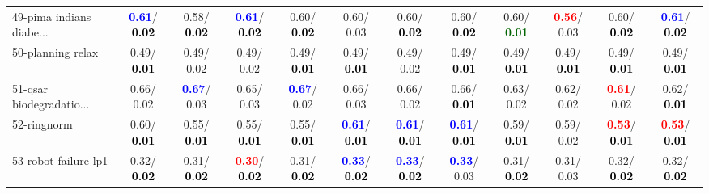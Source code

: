 \begin{table}[h]
\begin{center}
{\begin{tabular}{lc|c|c|c|c|c|c|c|c|c|c}
49-pima indians diabe... & \textcolor{blue}{\textbf{  0.61}}/\textcolor{black}{\textbf{  0.02}} &   0.58/\textcolor{black}{\textbf{  0.02}} & \textcolor{blue}{\textbf{  0.61}}/\textcolor{black}{\textbf{  0.02}} &   0.60/\textcolor{black}{\textbf{  0.02}} &   0.60/  0.03 &   0.60/\textcolor{black}{\textbf{  0.02}} &   0.60/\textcolor{black}{\textbf{  0.02}} &   0.60/\textcolor{darkgreen}{\textbf{  0.01}} & \textcolor{red}{\textbf{  0.56}}/  0.03 &   0.60/\textcolor{black}{\textbf{  0.02}} & \textcolor{blue}{\textbf{  0.61}}/\textcolor{black}{\textbf{  0.02}} \\
50-planning relax &   0.49/\textcolor{black}{\textbf{  0.01}} &   0.49/  0.02 &   0.49/  0.02 &   0.49/\textcolor{black}{\textbf{  0.01}} &   0.49/\textcolor{black}{\textbf{  0.01}} &   0.49/  0.02 &   0.49/\textcolor{black}{\textbf{  0.01}} &   0.49/\textcolor{black}{\textbf{  0.01}} &   0.49/\textcolor{black}{\textbf{  0.01}} &   0.49/\textcolor{black}{\textbf{  0.01}} &   0.49/\textcolor{black}{\textbf{  0.01}} \\
51-qsar biodegradatio... &   0.66/  0.02 & \textcolor{blue}{\textbf{  0.67}}/  0.03 &   0.65/  0.03 & \textcolor{blue}{\textbf{  0.67}}/  0.02 &   0.66/  0.03 &   0.66/  0.02 &   0.66/\textcolor{black}{\textbf{  0.01}} &   0.63/  0.02 &   0.62/  0.02 & \textcolor{red}{\textbf{  0.61}}/  0.02 &   0.62/\textcolor{black}{\textbf{  0.01}} \\
52-ringnorm &   0.60/\textcolor{black}{\textbf{  0.01}} &   0.55/\textcolor{black}{\textbf{  0.01}} &   0.55/\textcolor{black}{\textbf{  0.01}} &   0.55/\textcolor{black}{\textbf{  0.01}} & \textcolor{blue}{\textbf{  0.61}}/\textcolor{black}{\textbf{  0.01}} & \textcolor{blue}{\textbf{  0.61}}/\textcolor{black}{\textbf{  0.01}} & \textcolor{blue}{\textbf{  0.61}}/\textcolor{black}{\textbf{  0.01}} &   0.59/\textcolor{black}{\textbf{  0.01}} &   0.59/  0.02 & \textcolor{red}{\textbf{  0.53}}/\textcolor{black}{\textbf{  0.01}} & \textcolor{red}{\textbf{  0.53}}/\textcolor{black}{\textbf{  0.01}} \\
53-robot failure lp1 &   0.32/\textcolor{black}{\textbf{  0.02}} &   0.31/\textcolor{black}{\textbf{  0.02}} & \textcolor{red}{\textbf{  0.30}}/\textcolor{black}{\textbf{  0.02}} &   0.31/\textcolor{black}{\textbf{  0.02}} & \textcolor{blue}{\textbf{  0.33}}/\textcolor{black}{\textbf{  0.02}} & \textcolor{blue}{\textbf{  0.33}}/\textcolor{black}{\textbf{  0.02}} & \textcolor{blue}{\textbf{  0.33}}/  0.03 &   0.31/\textcolor{black}{\textbf{  0.02}} &   0.31/  0.03 &   0.32/\textcolor{black}{\textbf{  0.02}} &   0.32/\textcolor{black}{\textbf{  0.02}} \\ \hline

\end{tabular}}
\end{center}
\end{table}
